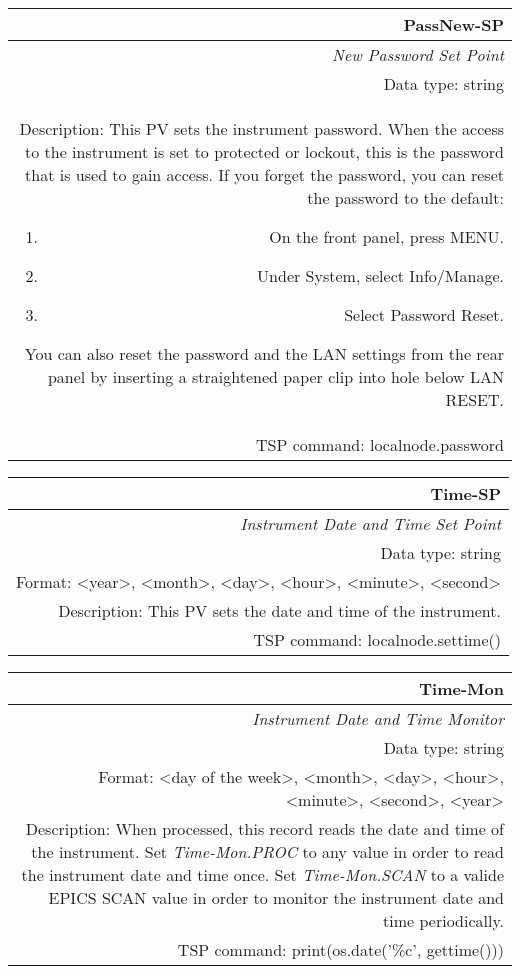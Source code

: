 \documentclass[openany]{article}
\begin{document}
		\begin{tabular}{N}
			\hline
			\bfseries PassNew-SP\label{pv:passnew-sp} \\ \hline
			\emph{New Password Set Point} \\
			Data type: string \\
			Description: This PV sets the instrument password. When the access to the instrument is set to protected or lockout, this is the password that is used to gain access. If you forget the password, you can reset the password to the default: \begin{enumerate} \item On the front panel, press MENU. \item Under System, select Info/Manage. \item Select Password Reset. \end{enumerate} You can also reset the password and the LAN settings from the rear panel by inserting a straightened paper clip into hole below LAN RESET. \\
			TSP command: localnode.password
		\end{tabular}

		\begin{tabular}{N}
			\hline
			\bfseries Time-SP\label{pv:time-sp} \\ \hline
			\emph{Instrument Date and Time Set Point} \\
			Data type: string \\
			Format: \textless year\textgreater, \textless month\textgreater, \textless day\textgreater, \textless hour\textgreater, \textless minute\textgreater, \textless second\textgreater \\
			Description: This PV sets the date and time of the instrument. \\
			TSP command: localnode.settime()
		\end{tabular}

		\begin{tabular}{N}
			\hline
			\bfseries Time-Mon\label{pv:time-mon} \\ \hline
			\emph{Instrument Date and Time Monitor} \\
			Data type: string \\
			Format: \textless day of the week\textgreater, \textless month\textgreater, \textless day\textgreater, \textless hour\textgreater, \textless minute\textgreater, \textless second\textgreater, \textless year\textgreater \\
			Description: When processed, this record reads the date and time of the instrument. Set \emph{Time-Mon.PROC} to any value in order to read the instrument date and time once. Set \emph{Time-Mon.SCAN} to a valide EPICS SCAN value in order to monitor the instrument date and time periodically. \\
			TSP command: print(os.date('\%c', gettime()))
		\end{tabular}
\end{document}
